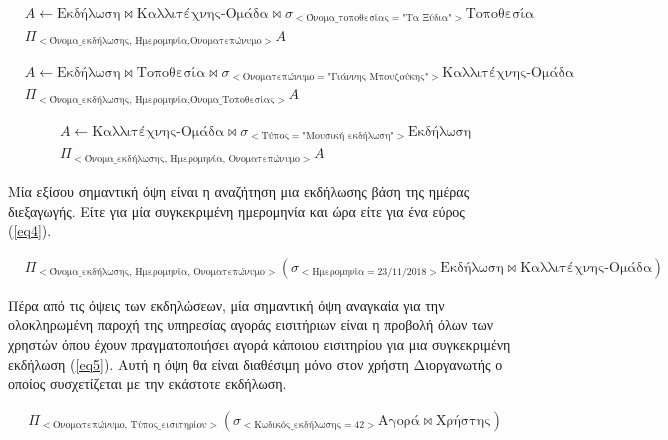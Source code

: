 \begin{equation} \label{eq1}
\begin{split}
&A \leftarrow \text{Εκδήλωση} \bowtie
\text{Καλλιτέχνης-Ομάδα} \bowtie
\sigma_{<\text{Όνομα\_τοποθεσίας} = \text{"Τα Ξύδια"}>}
\text{Τοποθεσία}
\\
&\Pi_{<\text{Όνομα\_εκδήλωσης, Ημερομηνία,Ονοματεπώνυμο}>}A
\end{split}
\end{equation}

\begin{equation} \label{eq2}
\begin{split}
&A \leftarrow \text{Εκδήλωση} \bowtie
\text{Τοποθεσία} \bowtie
\sigma_{<\text{Ονοματεπώνυμο} = \text{"Γιάννης Μπουζούκης"}>}
\text{Καλλιτέχνης-Ομάδα}
\\
&\Pi_{<\text{Όνομα\_εκδήλωσης, Ημερομηνία,Όνομα\_Τοποθεσίας}>}A
\end{split}
\end{equation}

\begin{equation} \label{eq3}
\begin{split}
&A \leftarrow \text{Καλλιτέχνης-Ομάδα} \bowtie
\sigma_{<\text{Τύπος} = \text{"Μουσική εκδήλωση"}>}\text{Εκδήλωση}
\\
&\Pi_{<\text{Όνομα\_εκδήλωσης, Ημερομηνία, Ονοματεπώνυμο}>}A
\end{split}
\end{equation}

Μία εξίσου σημαντική όψη είναι η αναζήτηση μια εκδήλωσης βάση της
ημέρας διεξαγωγής. Είτε για μία συγκεκριμένη ημερομηνία και ώρα είτε
για ένα εύρος (\ref{eq4}).

\begin{equation}
  \label{eq4}
  \begin{split}
    &\Pi_{<\text{Όνομα\_εκδήλωσης, Ημερομηνία, Ονοματεπώνυμο}>}(
    \sigma_{<\text{Ημερομηνία} = 23/11/2018>} \text{Εκδήλωση} \bowtie
    \text{Καλλιτέχνης-Ομάδα})
  \end{split}
\end{equation}

Πέρα από τις όψεις των εκδηλώσεων, μία σημαντική όψη αναγκαία για την
ολοκληρωμένη παροχή της υπηρεσίας αγοράς εισιτήριων είναι η προβολή
όλων των χρηστών όπου έχουν πραγματοποιήσει αγορά κάποιου εισιτηρίου
για μια συγκεκριμένη εκδήλωση (\ref{eq5}). Αυτή η όψη θα είναι διαθέσιμη μόνο στον
χρήστη Διοργανωτής ο οποίος συσχετίζεται με την εκάστοτε εκδήλωση.

\begin{equation}
  \label{eq5}
  \begin{split}
    &\Pi_{<\text{Ονοματεπώνυμο, Τύπος\_εισιτηρίου}>}(
    \sigma_{<\text{Κωδικός\_εκδήλωσης} = 42>} \text{Αγορά} \bowtie
    \text{Χρήστης})
  \end{split}
\end{equation}

